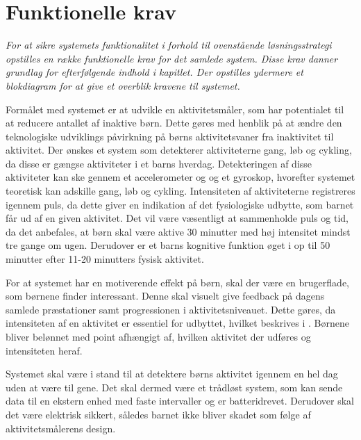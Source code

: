 \section{Funktionelle krav}\label{funktionellekrav}
\textit{For at sikre systemets funktionalitet i forhold til ovenstående løsningsstrategi opstilles en række funktionelle krav for det samlede system. Disse krav danner grundlag for efterfølgende indhold i kapitlet. Der opstilles ydermere et blokdiagram for at give et overblik kravene til systemet.}

Formålet med systemet er at udvikle en aktivitetsmåler, som har potentialet til at reducere antallet af inaktive børn. Dette gøres med henblik på at ændre den teknologiske udviklings påvirkning på børns aktivitetsvaner fra inaktivitet til aktivitet. Der ønskes et system som detekterer aktiviteterne gang, løb og cykling, da disse er gængse aktiviteter i et barns hverdag. Detekteringen af disse aktiviteter kan ske gennem et accelerometer og og et gyroskop, hvorefter systemet teoretisk kan adskille gang, løb og cykling. Intensiteten af aktiviteterne registreres igennem puls, da dette giver en indikation af det fysiologiske udbytte, som barnet får ud af en given aktivitet. Det vil være væsentligt at sammenholde puls og tid, da det anbefales, at børn skal være aktive 30 minutter med høj intensitet mindst tre gange om ugen. Derudover er et barns kognitive funktion øget i op til 50 minutter efter 11-20 minutters fysisk aktivitet.

For at systemet har en motiverende effekt på børn, skal der være en brugerflade, som børnene finder interessant. Denne skal visuelt give feedback på dagens samlede præstationer samt progressionen i aktivitetsniveauet. Dette gøres, da intensiteten af en aktivitet er essentiel for udbyttet, hvilket beskrives i . %
Børnene bliver belønnet med point afhængigt af, hvilken aktivitet der udføres og intensiteten heraf.  

Systemet skal være i stand til at detektere børns aktivitet igennem en hel dag uden at være til gene. %
Det skal dermed være et trådløst system, som kan sende data til en ekstern enhed med faste intervaller og er batteridrevet. Derudover skal det være elektrisk sikkert, således barnet ikke bliver skadet som følge af aktivitetsmålerens design. 

